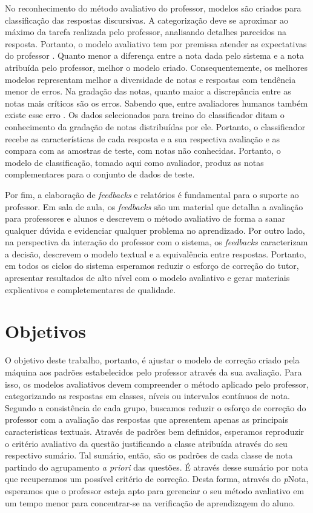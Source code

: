 No reconhecimento do método avaliativo do professor, modelos são criados para classificação das respostas discursivas. A categorização deve se aproximar ao máximo da tarefa realizada pelo professor, analisando detalhes parecidos na resposta. Portanto, o modelo avaliativo tem por premissa atender as expectativas do professor \cite{pado2021}. Quanto menor a diferença entre a nota dada pelo sistema e a nota atribuída pelo professor, melhor o modelo criado. Consequentemente, os melhores modelos representam melhor a diversidade de notas e respostas com tendência menor de erros. Na gradação das notas, quanto maior a discrepância entre as notas mais críticos são os erros. Sabendo que, entre avaliadores humanos também existe esse erro \cite{artstein2008}. Os dados selecionados para treino do classificador ditam o conhecimento da gradação de notas distribuídas por ele. Portanto, o classificador recebe as características de cada resposta e a sua respectiva avaliação e as compara com as amostras de teste, com notas não conhecidas. Portanto, o modelo de classificação, tomado aqui como avaliador, produz as notas complementares para o conjunto de dados de teste.

Por fim, a elaboração de \textit{feedbacks} e relatórios é fundamental para o suporte ao professor. Em sala de aula, os \textit{feedbacks} são um material que detalha a avaliação para professores e alunos e descrevem o método avaliativo de forma a sanar qualquer dúvida e evidenciar qualquer problema no aprendizado. Por outro lado, na perspectiva da interação do professor com o sistema, os \textit{feedbacks} caracterizam a decisão, descrevem o modelo textual e a equivalência entre respostas. Portanto, em todos os ciclos do sistema esperamos reduzir o esforço de correção do tutor, apresentar resultados de alto nível com o modelo avaliativo e gerar materiais explicativos e completementares de qualidade.

\section{Objetivos} \label{cap1-objetivos}

O objetivo deste trabalho, portanto, é ajustar o modelo de correção criado pela máquina aos padrões estabelecidos pelo professor através da sua avaliação. Para isso, os modelos avaliativos devem compreender o método aplicado pelo professor, categorizando as respostas em classes, níveis ou intervalos contínuos de nota. Segundo a consistência de cada grupo, buscamos reduzir o esforço de correção do professor com a avaliação das respostas que apresentem apenas as principais caracteristicas textuais. Através de padrões bem definidos, esperamos reproduzir o critério avaliativo da questão justificando a classe atribuída através do seu respectivo sumário. Tal sumário, então, são os padrões de cada classe de nota partindo do agrupamento \textit{a priori} das questões. É através desse sumário por nota que recuperamos um possível critério de correção. Desta forma, através do \textit{p}Nota, esperamos que o professor esteja apto para gerenciar o seu método avaliativo em um tempo menor para concentrar-se na verificação de aprendizagem do aluno.

